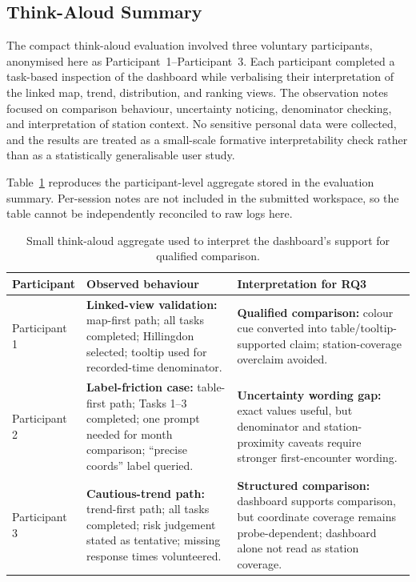 \subsection{Think-Aloud Summary}

The compact think-aloud evaluation involved three voluntary participants, anonymised here as Participant~1--Participant~3. Each participant completed a task-based inspection of the dashboard while verbalising their interpretation of the linked map, trend, distribution, and ranking views. The observation notes focused on comparison behaviour, uncertainty noticing, denominator checking, and interpretation of station context. No sensitive personal data were collected, and the results are treated as a small-scale formative interpretability check rather than as a statistically generalisable user study.

Table~\ref{tab:thinkaloud-summary} reproduces the participant-level aggregate stored in the evaluation summary. Per-session notes are not included in the submitted workspace, so the table cannot be independently reconciled to raw logs here.

\begin{table}[H]
\centering
\small
\begin{tabularx}{\textwidth}{p{2.3cm}XX}
\toprule
Participant & Observed behaviour & Interpretation for RQ3 \\
\midrule
Participant 1 & \textbf{Linked-view validation:} map-first path; all tasks completed; Hillingdon selected; tooltip used for recorded-time denominator. & \textbf{Qualified comparison:} colour cue converted into table/tooltip-supported claim; station-coverage overclaim avoided. \\
Participant 2 & \textbf{Label-friction case:} table-first path; Tasks 1--3 completed; one prompt needed for month comparison; ``precise coords'' label queried. & \textbf{Uncertainty wording gap:} exact values useful, but denominator and station-proximity caveats require stronger first-encounter wording. \\
Participant 3 & \textbf{Cautious-trend path:} trend-first path; all tasks completed; risk judgement stated as tentative; missing response times volunteered. & \textbf{Structured comparison:} dashboard supports comparison, but coordinate coverage remains probe-dependent; dashboard alone not read as station coverage. \\
\bottomrule
\end{tabularx}
\caption{Small think-aloud aggregate used to interpret the dashboard's support for qualified comparison.}
\label{tab:thinkaloud-summary}
\end{table}

